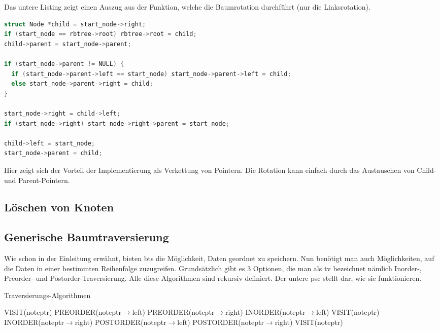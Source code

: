 \documentclass[11pt]{article}
\begin{document}
Das untere Listing zeigt einen Auszug aus der Funktion, welche die Baumrotation durchführt (nur die Linksrotation).

\begin{lstlisting}[language=C]
struct Node *child = start_node->right;
if (start_node == rbtree->root) rbtree->root = child;
child->parent = start_node->parent;

if (start_node->parent != NULL) {
  if (start_node->parent->left == start_node) start_node->parent->left = child;
  else start_node->parent->right = child;
}

start_node->right = child->left;
if (start_node->right) start_node->right->parent = start_node;

child->left = start_node;
start_node->parent = child; 
\end{lstlisting}

Hier zeigt sich der Vorteil der Implementierung als Verkettung von Pointern. Die Rotation kann einfach durch das Austauschen von Child- und Parent-Pointern.


\pagebreak

\subsection{Löschen von Knoten}

\pagebreak
\subsection{Generische Baumtraversierung} \label{tr}
Wie schon in der Einleitung erwähnt, bieten \glspl{bt} die Möglichkeit, Daten geordnet zu speichern. Nun benötigt man auch Möglichkeiten, auf die Daten in einer bestimmten Reihenfolge zuzugreifen. Grundsätzlich gibt es 3 Optionen, die man als \gls{tv} bezeichnet nämlich Inorder-, Preorder- und Postorder-Traversierung.
Alle diese Algorithmen sind rekursiv definiert. \cite[S. 44ff]{aic}  Der untere \gls{psc} stellt dar, wie sie funktionieren. 

\begin{algorithm}
  \caption{Traversierungs-Algorithmen}
  \begin{algorithmic}[1]  
      \Return
    \EndIf
    \State VISIT(noteptr)
    \State PREORDER(noteptr$\rightarrow$left)
    \State PREORDER(noteptr$\rightarrow$right)
  \EndProcedure
      \Return
    \EndIf
    \State INORDER(noteptr$\rightarrow$left)
    \State VISIT(noteptr)
    \State INORDER(noteptr$\rightarrow$right)
  \EndProcedure
      \Return
    \EndIf
    \State POSTORDER(noteptr$\rightarrow$left)
    \State POSTORDER(noteptr$\rightarrow$right)
    \State VISIT(noteptr)  
  \EndProcedure
  \end{algorithmic}
\end{algorithm}
\cite[S. 318ff]{aop}
\end{document}
